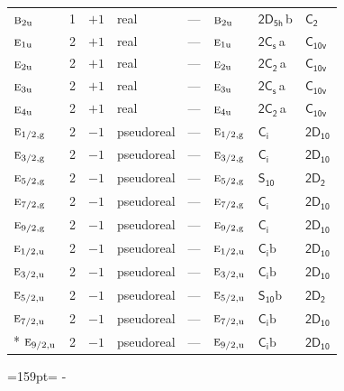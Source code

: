 \documentclass[10pt,a4paper]{article}
\makeatletter
\def\grouprule#1#2{\noalign{\marks\LTgroupmarks{\the\belowrulesep}\nobreak\vskip#1%
  \vskip\aboverulesep}\multispan\LT@cols\unskip{\leaders\hrule\@height#2\hfill\kern\z@}\cr
  \noalign{\penalty\LTrulebreak\vskip\belowrulesep\global\@lastruleclass\z@}}
\newcommand{\needspace}[1]{\par\penalty-100\begingroup\dimen0=#1\relax\dimen2=\pagegoal
  \advance\dimen2-\pagetotal\ifdim\dimen0>\dimen2\relax\ifdim\dimen2>0pt\vfil\break\fi\fi
  \endgroup}
\numberwithin{equation}{section}
\newcommand{\grp}[1]{\mathsf{#1}}
\newcommand{\irr}[1]{\text{\normalfont\scshape #1}}
\newcommand{\ptag}[1]{\mathrm{#1}}
\newcommand{\clsletter}[1]{\,{\scriptsize\color{black!55}#1}}
\newcommand{\secondclass}{\mathrm{b}}
\makeatother
\begin{document}
{\begin{longtable}{@{}lrrlllll@{}}
$\irr{b}_{2\ptag{u}}$ & 1 & $+1$ & real & --- & $\irr{b}_{2\ptag{u}}$ & \href{2D5h.pdf}{$\grp{2D_{5h}}$}\clsletter{b} & \href{../../../rotation/data/pdf/C2.pdf}{$\grp{C_{2}}$}\\
$\irr{e}_{1\ptag{u}}$ & 2 & $+1$ & real & --- & $\irr{e}_{1\ptag{u}}$ & \href{2C1v.pdf}{$\grp{2C_{s}}$}\clsletter{a} & \href{../../../rotation/data/pdf/C10v.pdf}{$\grp{C_{10v}}$}\\
$\irr{e}_{2\ptag{u}}$ & 2 & $+1$ & real & --- & $\irr{e}_{2\ptag{u}}$ & \href{2C2.pdf}{$\grp{2C_{2}}$}\clsletter{a} & \href{../../../rotation/data/pdf/C10v.pdf}{$\grp{C_{10v}}$}\\
$\irr{e}_{3\ptag{u}}$ & 2 & $+1$ & real & --- & $\irr{e}_{3\ptag{u}}$ & \href{2C1v.pdf}{$\grp{2C_{s}}$}\clsletter{a} & \href{../../../rotation/data/pdf/C10v.pdf}{$\grp{C_{10v}}$}\\
$\irr{e}_{4\ptag{u}}$ & 2 & $+1$ & real & --- & $\irr{e}_{4\ptag{u}}$ & \href{2C2.pdf}{$\grp{2C_{2}}$}\clsletter{a} & \href{../../../rotation/data/pdf/C10v.pdf}{$\grp{C_{10v}}$}\\
\grouprule{0pt}{\lightrulewidth}
$\irr{e}_{1/2,\ptag{g}}$ & 2 & $-1$ & pseudoreal & --- & $\irr{e}_{1/2,\ptag{g}}$ & \href{S2.pdf}{$\grp{C_{i}}$} & \href{2D10.pdf}{$\grp{2D_{10}}$}\\
$\irr{e}_{3/2,\ptag{g}}$ & 2 & $-1$ & pseudoreal & --- & $\irr{e}_{3/2,\ptag{g}}$ & \href{S2.pdf}{$\grp{C_{i}}$} & \href{2D10.pdf}{$\grp{2D_{10}}$}\\
$\irr{e}_{5/2,\ptag{g}}$ & 2 & $-1$ & pseudoreal & --- & $\irr{e}_{5/2,\ptag{g}}$ & \href{S10.pdf}{$\grp{S_{10}}$} & \href{2D2.pdf}{$\grp{2D_{2}}$}\\
$\irr{e}_{7/2,\ptag{g}}$ & 2 & $-1$ & pseudoreal & --- & $\irr{e}_{7/2,\ptag{g}}$ & \href{S2.pdf}{$\grp{C_{i}}$} & \href{2D10.pdf}{$\grp{2D_{10}}$}\\
$\irr{e}_{9/2,\ptag{g}}$ & 2 & $-1$ & pseudoreal & --- & $\irr{e}_{9/2,\ptag{g}}$ & \href{S2.pdf}{$\grp{C_{i}}$} & \href{2D10.pdf}{$\grp{2D_{10}}$}\\
$\irr{e}_{1/2,\ptag{u}}$ & 2 & $-1$ & pseudoreal & --- & $\irr{e}_{1/2,\ptag{u}}$ & \href{S2b.pdf}{$\grp{C_{i}}\secondclass$} & \href{2D10.pdf}{$\grp{2D_{10}}$}\\
$\irr{e}_{3/2,\ptag{u}}$ & 2 & $-1$ & pseudoreal & --- & $\irr{e}_{3/2,\ptag{u}}$ & \href{S2b.pdf}{$\grp{C_{i}}\secondclass$} & \href{2D10.pdf}{$\grp{2D_{10}}$}\\
$\irr{e}_{5/2,\ptag{u}}$ & 2 & $-1$ & pseudoreal & --- & $\irr{e}_{5/2,\ptag{u}}$ & \href{S10b.pdf}{$\grp{S_{10}}\secondclass$} & \href{2D2.pdf}{$\grp{2D_{2}}$}\\
$\irr{e}_{7/2,\ptag{u}}$ & 2 & $-1$ & pseudoreal & --- & $\irr{e}_{7/2,\ptag{u}}$ & \href{S2b.pdf}{$\grp{C_{i}}\secondclass$} & \href{2D10.pdf}{$\grp{2D_{10}}$}\\*
$\irr{e}_{9/2,\ptag{u}}$ & 2 & $-1$ & pseudoreal & --- & $\irr{e}_{9/2,\ptag{u}}$ & \href{S2b.pdf}{$\grp{C_{i}}\secondclass$} & \href{2D10.pdf}{$\grp{2D_{10}}$}\\
\bottomrule\end{longtable}}
\needspace{159pt}
\end{document}
